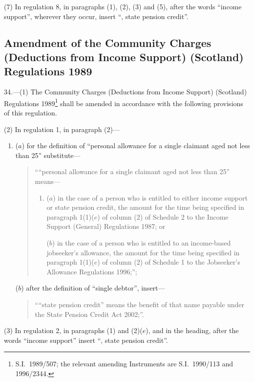 \documentclass[12pt,a4paper]{article}
\begin{document}
(7) In regulation 8, in paragraphs (1), (2), (3) and (5), after the words “income support”, wherever they occur, insert “, state pension credit”.

\subsection[34. Amendment of the Community Charges (Deductions from Income Support) (Scotland) Regulations 1989]{Amendment of the Community Charges (Deductions from Income Support) (Scotland) Regulations 1989}

34.---(1)  The Community Charges (Deductions from Income Support) (Scotland) Regulations 1989\footnote{S.I.\ 1989/507; the relevant amending Instruments are S.I.\ 1990/113 and 1996/2344.} shall be amended in accordance with the following provisions of this regulation.

(2) In regulation 1, in paragraph (2)—
\begin{enumerate}\item[]
($a$) for the definition of “personal allowance for a single claimant aged not less than 25” substitute—
\begin{quotation}
    ““personal allowance for a single claimant aged not less than 25” means—
\begin{enumerate}\item[]
    ($a$) 
    in the case of a person who is entitled to either income support or state pension credit, the amount for the time being specified in paragraph 1(1)($e$)  of column (2) of Schedule 2 to the Income Support (General) Regulations 1987; or

    ($b$) 
    in the case of a person who is entitled to an income-based jobseeker’s allowance, the amount for the time being specified in paragraph 1(1)($e$)  of column (2) of Schedule 1 to the Jobseeker’s Allowance Regulations 1996;”; 
\end{enumerate}
\end{quotation}

($b$) after the definition of “single debtor”, insert—
\begin{quotation}
““state pension credit” means the benefit of that name payable under the State Pension Credit Act 2002;”.
\end{quotation}
\end{enumerate}

(3) In regulation 2, in paragraphs (1) and (2)($e$), and in the heading, after the words “income support” insert “, state pension credit”.
\end{document}
